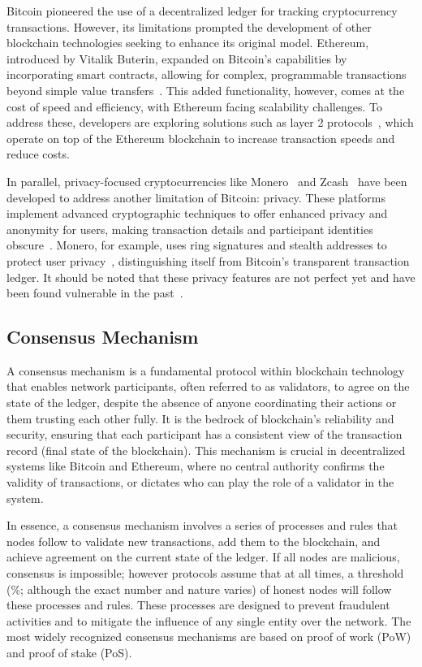 Bitcoin pioneered the use of a decentralized ledger for tracking cryptocurrency transactions. However, its limitations prompted the development of other blockchain technologies seeking to enhance its original model. Ethereum, introduced by Vitalik Buterin, expanded on Bitcoin’s capabilities by incorporating smart contracts, allowing for complex, programmable transactions beyond simple value transfers~\cite{buterin2014next}. This added functionality, however, comes at the cost of speed and efficiency, with Ethereum facing scalability challenges. To address these, developers are exploring solutions such as layer 2 protocols~\cite{clark2018sok:online,optimismgithub,kalodner2018arbitrum}, which operate on top of the Ethereum blockchain to increase transaction speeds and reduce costs.

In parallel, privacy-focused cryptocurrencies like Monero~\cite{monero} and Zcash~\cite{hopwood2016zcash} have been developed to address another limitation of Bitcoin: privacy. These platforms implement advanced cryptographic techniques to offer enhanced privacy and anonymity for users, making transaction details and participant identities obscure~\cite{van2013cryptonote, miers2013zerocoin}. Monero, for example, uses ring signatures and stealth addresses to protect user privacy~\cite{cryptoeprint2015}, distinguishing itself from Bitcoin's transparent transaction ledger. It should be noted that these privacy features are not perfect yet and have been found vulnerable in the past~\cite{kumar2017traceability,miller2017empirical}.



\subsection{Consensus Mechanism}\label{consensus_mechanism}
A consensus mechanism is a fundamental protocol within blockchain technology that enables network participants, often referred to as validators, to agree on the state of the ledger, despite the absence of anyone coordinating their actions or them trusting each other fully. It is the bedrock of blockchain's reliability and security, ensuring that each participant has a consistent view of the transaction record (final state of the blockchain). This mechanism is crucial in decentralized systems like Bitcoin and Ethereum, where no central authority confirms the validity of transactions, or dictates who can play the role of a validator in the system. 

In essence, a consensus mechanism involves a series of processes and rules that nodes follow to validate new transactions, add them to the blockchain, and achieve agreement on the current state of the ledger. If all nodes are malicious, consensus is impossible; however protocols assume that at all times, a threshold (\%; although the exact number and nature varies) of honest nodes will follow these processes and rules. These processes are designed to prevent fraudulent activities and to mitigate the influence of any single entity over the network. The most widely recognized consensus mechanisms are based on proof of work (PoW) and proof of stake (PoS).

